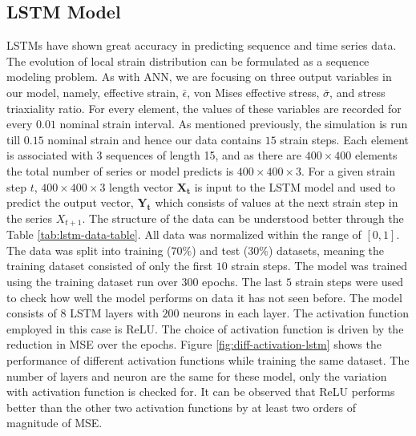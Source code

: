 \subsection{LSTM Model}
LSTMs have shown great accuracy in predicting sequence and time series data. The evolution of local strain distribution can be formulated as a sequence modeling problem. As with ANN, we are focusing on three output variables in our model, namely, effective strain, ${\bar{\epsilon}}$, von Mises effective stress,  $\bar{\sigma}$, and stress triaxiality ratio. For every element, the values of these variables are recorded for every $0.01$ nominal strain interval. As mentioned previously, the simulation is run till $0.15$ nominal strain and hence our data contains $15$ strain steps. Each element is associated with 3 sequences of length 15, and as there are $400\times400$ elements the total number of series or model predicts is $400\times400\times3$. For a given strain step $t$, $400\times400\times3$ length vector $\boldsymbol{X_t}$ is input to the LSTM model and used to predict the output vector, $\boldsymbol{Y_t}$ which consists of values at the next strain step in the series $X_{t+1}$. The structure of the data can be understood better through the Table \ref{tab:lstm-data-table}. All data was normalized within the range of $[0,1]$. The data was split into training ($70\%$) and test ($30\%$) datasets, meaning the training dataset consisted of only the first $10$ strain steps. The model was trained using the training dataset run over 300 epochs. The last $5$ strain steps were used to check how well the model performs on data it has not seen before. The model consists of $8$ LSTM layers with $200$ neurons in each layer. The activation function employed in this case is ReLU. The choice of activation function is driven by the reduction in MSE over the epochs. Figure \ref{fig:diff-activation-lstm} shows the performance of different activation functions while training the same dataset. The number of layers and neuron are the same for these model, only the variation with activation function is checked for. It can be observed that ReLU performs better than the other two activation functions by at least two orders of magnitude of MSE.

